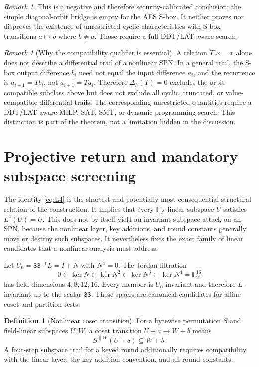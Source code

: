 \documentclass[10pt,reqno]{amsart}
\theoremstyle{plain}
\theoremstyle{remark}\newtheorem{remark}[theorem]{Remark}
\theoremstyle{definition}\newtheorem{definition}[theorem]{Definition}
\newcommand{\hex}[1]{\mathtt{#1}}
\begin{document}
\begin{remark}
This is a negative and therefore security-calibrated conclusion: the
simple diagonal-orbit bridge is empty for the AES S-box. It neither proves
nor disproves the existence of unrestricted cyclic characteristics with
S-box transitions $a\mapsto b$ where $b\ne a$. Those require a full
DDT/LAT-aware search.
\end{remark}

\begin{remark}[Why the compatibility qualifier is essential]\label{rem:compatibility}
A relation $T^e x=x$ alone does not describe a differential trail of a nonlinear SPN. In a general trail, the S-box output difference $b_i$ need not equal the input difference $a_i$, and the recurrence is $a_{i+1}=Tb_i$, not $a_{i+1}=Ta_i$. Therefore $\Delta_h(T)=0$ excludes the orbit-compatible subclass above but does not exclude all cyclic, truncated, or value-compatible differential trails. The corresponding unrestricted quantities require a DDT/LAT-aware MILP, SAT, SMT, or dynamic-programming search. This distinction is part of the theorem, not a limitation hidden in the discussion.
\end{remark}
\section{Projective return and mandatory subspace screening}\label{sec:subspace-screening}
The identity \eqref{eq:L4} is the shortest and potentially most consequential structural relation of the construction. It implies that every $\mathbb F_{2^8}$-linear subspace $U$ satisfies $L^4(U)=U$. This does not by itself yield an invariant-subspace attack on an SPN, because the nonlinear layer, key additions, and round constants generally move or destroy such subspaces. It nevertheless fixes the exact family of linear candidates that a nonlinear analysis must address.

Let $U_0=\hex{33}^{-1}L=I+N$ with $N^4=0$. The Jordan filtration
\[
0\subset \ker N\subset\ker N^2\subset\ker N^3\subset\ker N^4=\mathbb F_{2^8}^{16}
\]
has field dimensions $4,8,12,16$. Every member is $U_0$-invariant and therefore $L$-invariant up to the scalar $\hex{33}$. These spaces are canonical candidates for affine-coset and partition tests.

\begin{definition}[Nonlinear coset transition]\label{def:coset-transition}
For a bytewise permutation $S$ and field-linear subspaces $U,W$, a coset transition $U+a\rightarrow W+b$ means
\[
S^{\parallel16}(U+a)\subseteq W+b.
\]
A four-step subspace trail for a keyed round additionally requires compatibility with the linear layer, the key-addition convention, and all round constants.
\end{definition}
\end{document}
